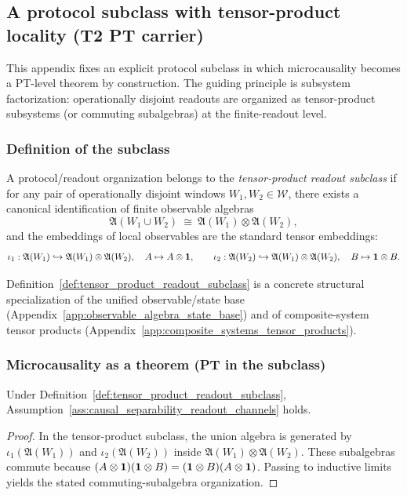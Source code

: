 \subsection{A protocol subclass with tensor-product locality (T2 PT carrier)}
\label{app:protocol_subclass_tensor_net}

\AuditTag This appendix fixes an explicit protocol subclass in which microcausality becomes a PT-level theorem by construction.
The guiding principle is subsystem factorization: operationally disjoint readouts are organized as tensor-product subsystems (or commuting subalgebras) at the finite-readout level.

\subsubsection{Definition of the subclass}
\begin{definition}
\label{def:tensor_product_readout_subclass}
\MathTag A protocol/readout organization belongs to the \emph{tensor-product readout subclass} if for any pair of operationally disjoint windows $W_1,W_2\in\mathcal{W}$, there exists a canonical identification of finite observable algebras
\[
\mathfrak{A}(W_1\cup W_2)\ \cong\ \mathfrak{A}(W_1)\otimes \mathfrak{A}(W_2),
\]
and the embeddings of local observables are the standard tensor embeddings:
\[
\iota_1:\mathfrak{A}(W_1)\hookrightarrow \mathfrak{A}(W_1)\otimes\mathfrak{A}(W_2),\quad A\mapsto A\otimes \mathbf{1},
\qquad
\iota_2:\mathfrak{A}(W_2)\hookrightarrow \mathfrak{A}(W_1)\otimes\mathfrak{A}(W_2),\quad B\mapsto \mathbf{1}\otimes B.
\]
\end{definition}

\InterfaceTag Definition~\ref{def:tensor_product_readout_subclass} is a concrete structural specialization of the unified observable/state base (Appendix~\ref{app:observable_algebra_state_base}) and of composite-system tensor products (Appendix~\ref{app:composite_systems_tensor_products}).

\subsubsection{Microcausality as a theorem (PT in the subclass)}
\begin{proposition}
\label{prop:causal_separability_from_tensor_subclass}
\MathTag Under Definition~\ref{def:tensor_product_readout_subclass}, Assumption~\ref{ass:causal_separability_readout_channels} holds.
\end{proposition}
\begin{proof}
In the tensor-product subclass, the union algebra is generated by $\iota_1(\mathfrak{A}(W_1))$ and $\iota_2(\mathfrak{A}(W_2))$ inside $\mathfrak{A}(W_1)\otimes\mathfrak{A}(W_2)$.
These subalgebras commute because $(A\otimes \mathbf{1})(\mathbf{1}\otimes B)=(\mathbf{1}\otimes B)(A\otimes \mathbf{1})$.
Passing to inductive limits yields the stated commuting-subalgebra organization.
\end{proof}

